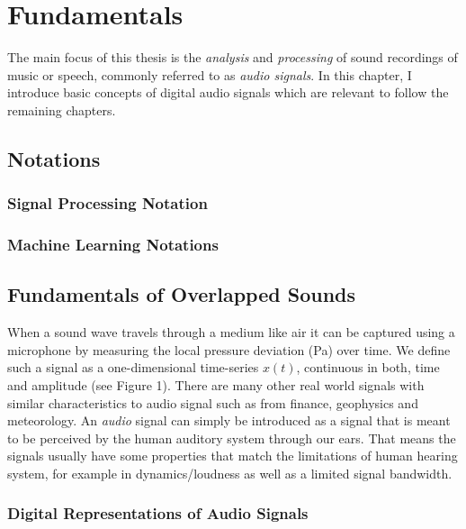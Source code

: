 \hypertarget{fundamentals}{%
\chapter{Fundamentals}\label{fundamentals}}

The main focus of this thesis is the \emph{analysis} and \emph{processing} of sound recordings of music or speech, commonly referred to as \emph{audio signals}.
In this chapter, I introduce basic concepts of digital audio signals which are relevant to follow the remaining chapters.

\section{Notations}

\subsection{Signal Processing Notation}
\subsection{Machine Learning Notations}

\hypertarget{Fundamentals of Overlapped Sounds}{%
\section{Fundamentals of Overlapped Sounds}\label{specifics-of-audio-signals}}

When a sound wave travels through a medium like air it can be captured using a microphone by measuring the local pressure deviation (Pa) over time.
We define such a signal as a one-dimensional time-series \(x(t)\), continuous in both, time and amplitude (see Figure 1).
There are many other real world signals with similar characteristics to audio signal such as from finance, geophysics and meteorology.
An \emph{audio} signal can simply be introduced as a signal that is meant to be perceived by the human auditory system through our ears.
That means the signals usually have some properties that match the limitations of human hearing system, for example in dynamics/loudness as well as a limited signal bandwidth.

\hypertarget{digital-representations-of-audio-signals}{%
\subsection{Digital Representations of Audio
Signals}\label{digital-representations-of-audio-signals}}

